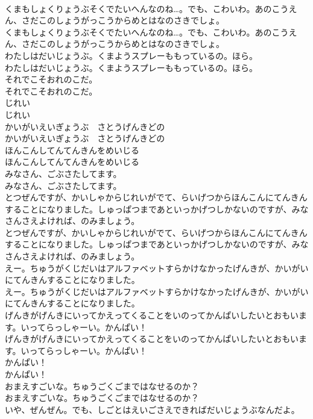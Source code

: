 \documentclass[8pt]{extreport}
\begin{document}
\begin{CJK}{UTF8}{min}
\\	くまもしょくりょうぶそくでたいへんなのね…。でも、こわいわ。あのこうえん、さだこのしょうがっこうからめとはなのさきでしょ。	
\\	くまもしょくりょうぶそくでたいへんなのね…。でも、こわいわ。あのこうえん、さだこのしょうがっこうからめとはなのさきでしょ。 
\\	わたしはだいじょうぶ。くまようスプレーももっているの。ほら。	
\\	わたしはだいじょうぶ。くまようスプレーももっているの。ほら。 
\\	それでこそおれのこだ。	
\\	それでこそおれのこだ。 
\\	じれい	
\\	じれい 
\\	かいがいえいぎょうぶ　さとうげんきどの	
\\	かいがいえいぎょうぶ　さとうげんきどの 
\\	ほんこんしてんてんきんをめいじる	
\\	ほんこんしてんてんきんをめいじる 
\\	みなさん、ごぶさたしてます。	
\\	みなさん、ごぶさたしてます。 
\\	とつぜんですが、かいしゃからじれいがでて、らいげつからほんこんにてんきんすることになりました。しゅっぱつまであといっかげつしかないのですが、みなさんさえよければ、のみましょう。	
\\	とつぜんですが、かいしゃからじれいがでて、らいげつからほんこんにてんきんすることになりました。しゅっぱつまであといっかげつしかないのですが、みなさんさえよければ、のみましょう。 
\\	えー。ちゅうがくじだいはアルファベットすらかけなかったげんきが、かいがいにてんきんすることになりました。	
\\	えー。ちゅうがくじだいはアルファベットすらかけなかったげんきが、かいがいにてんきんすることになりました。 
\\	げんきがげんきにいってかえってくることをいのってかんぱいしたいとおもいます。いってらっしゃーい。かんぱい！	
\\	げんきがげんきにいってかえってくることをいのってかんぱいしたいとおもいます。いってらっしゃーい。かんぱい！ 
\\	かんぱい！	
\\	かんぱい！ 
\\	おまえすごいな。ちゅうごくごまではなせるのか？	
\\	おまえすごいな。ちゅうごくごまではなせるのか？ 
\\	いや、ぜんぜん。でも、しごとはえいごさえできればだいじょうぶなんだよ。	

\end{CJK}
\end{document}
